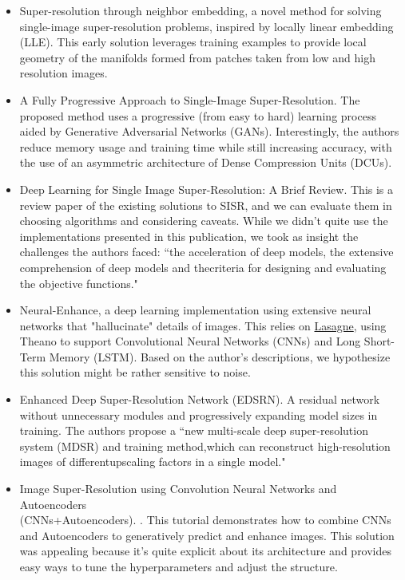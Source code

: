 \documentclass[letterpaper,12pt]{article}
\begin{document}
\begin{itemize}
    \item Super-resolution through neighbor embedding, \cite{HKUST} a novel method for solving single-image super-resolution problems, inspired by locally linear embedding (LLE). This early solution leverages training examples to provide local geometry of the manifolds formed from patches taken from low and high resolution images. \cite{HKUST}
    \item A Fully Progressive Approach to Single-Image Super-Resolution. \cite{DisneyResearch} The proposed method uses a progressive (from easy to hard) learning process aided by Generative Adversarial Networks (GANs). Interestingly, the authors reduce memory usage and training time while still increasing accuracy, with the use of an asymmetric architecture of Dense Compression Units (DCUs). \cite{DisneyResearch}
    \item Deep Learning for Single Image Super-Resolution: A Brief Review. \cite{DLSISR} This is a review paper of the existing solutions to SISR, and we can evaluate them in choosing algorithms and considering caveats. While we didn't quite use the implementations presented in this publication, we took as insight the challenges the authors faced:  ``the  acceleration  of  deep models, the extensive comprehension of deep models and thecriteria  for  designing  and  evaluating  the  objective  functions." \cite{DisneyResearch}
    \item Neural-Enhance, \cite{AlexJC} a deep learning implementation using extensive neural networks that "hallucinate" details of images. This relies on \href{https://github.com/Lasagne/Lasagne}{Lasagne}, using Theano to support Convolutional Neural Networks (CNNs) and Long Short-Term Memory (LSTM). \cite{Lasagne} Based on the author's descriptions, we hypothesize this solution might be rather sensitive to noise.
    \item Enhanced Deep Super-Resolution Network (EDSRN). \cite{Lim2017} A residual network without unnecessary modules and progressively expanding model sizes in training. The authors propose a ``new multi-scale deep super-resolution system (MDSR) and training method,which  can  reconstruct  high-resolution  images  of  differentupscaling factors in a single model." \cite{Lim2017}
    \item Image Super-Resolution using Convolution Neural Networks and Autoencoders\\(CNNs+Autoencoders). \cite{PatelH}. This tutorial demonstrates how to combine CNNs and Autoencoders to generatively predict and enhance images. \cite{PatelH} This solution was appealing because it's quite explicit about its architecture and provides easy ways to tune the hyperparameters and adjust the structure.
\end{itemize}
\end{document}
